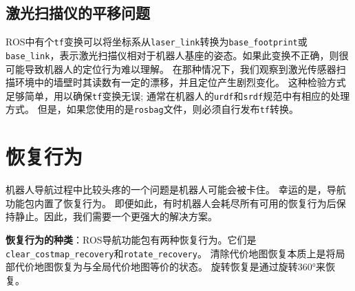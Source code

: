 \subsection[Translation of the laser scanner]{激光扫描仪的平移问题}


ROS中有个\texttt{tf}变换可以将坐标系从\texttt{laser\_link}转换为\texttt{base\_footprint}或\texttt{base\_link}，表示激光扫描仪相对于机器人基座的姿态。如果此变换不正确，则很可能导致机器人的定位行为难以理解。
在那种情况下，我们观察到激光传感器扫描环境中的墙壁时其读数有一定的漂移，并且定位产生剧烈变化。
这种检验方式足够简单，用以确保\texttt{tf}变换无误;
通常在机器人的\texttt{urdf}和\texttt{srdf}规范中有相应的处理方式。
但是，如果您使用的是\texttt{rosbag}文件，则必须自行发布\texttt{tf}转换。

\section[Recovery Behaviors]{恢复行为}%

机器人导航过程中比较头疼的一个问题是机器人可能会被卡住。 幸运的是，导航功能包内置了恢复行为。 
即便如此，有时机器人会耗尽所有可用的恢复行为后保持静止。因此，我们需要一个更强大的解决方案。

\textbf{恢复行为的种类}：ROS导航功能包有两种恢复行为。它们是\texttt{clear\_costmap\_recovery}和\texttt{rotate\_recovery}。
清除代价地图恢复本质上是将局部代价地图恢复为与全局代价地图等价的状态。
旋转恢复是通过旋转360°来恢复。

